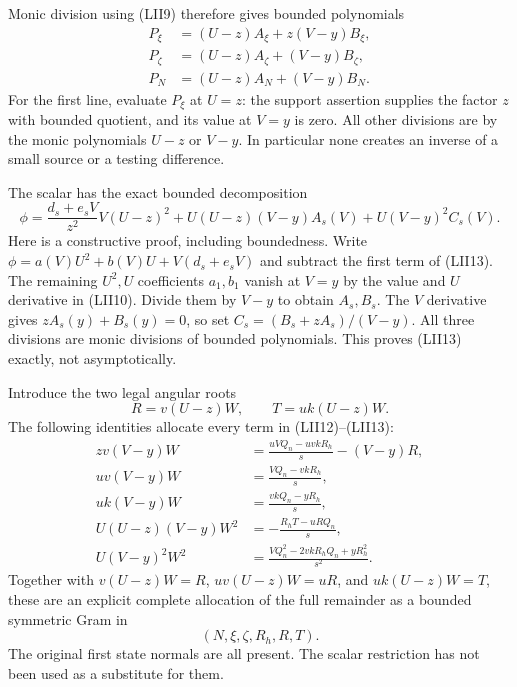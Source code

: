 Monic division using (LII9) therefore gives bounded polynomials
\[
\begin{split}
 P_\xi&=(U-z)A_\xi+z(V-y)B_\xi,\\
 P_\zeta&=(U-z)A_\zeta+(V-y)B_\zeta,\\
 P_N&=(U-z)A_N+(V-y)B_N.                         \end{split}\tag{LII12}
\]
For the first line, evaluate $P_\xi$ at $U=z$: the support assertion
supplies the factor $z$ with bounded quotient, and its value at $V=y$
is zero.  All other divisions are by the monic polynomials $U-z$
or $V-y$.  In particular none creates an inverse of a small source
or a testing difference.

The scalar has the exact bounded decomposition
\[
 \phi=\frac{d_s+e_sV}{z^2}V(U-z)^2
       +U(U-z)(V-y)A_s(V)+U(V-y)^2C_s(V).        \tag{LII13}
\]
Here is a constructive proof, including boundedness.  Write
$\phi=a(V)U^2+b(V)U+V(d_s+e_sV)$ and subtract the first term of
(LII13).  The remaining $U^2,U$ coefficients $a_1,b_1$ vanish at
$V=y$ by the value and $U$ derivative in (LII10).  Divide them by
$V-y$ to obtain $A_s,B_s$.  The $V$ derivative gives
$zA_s(y)+B_s(y)=0$, so set $C_s=(B_s+zA_s)/(V-y)$.
All three divisions are monic divisions of bounded polynomials.
This proves (LII13) exactly, not asymptotically.

Introduce the two legal angular roots
\[
 R=v(U-z)W,\qquad T=uk(U-z)W.                    \tag{LII14}
\]
The following identities allocate every term in (LII12)--(LII13):
\[
\begin{split}
 zv(V-y)W&=\frac{uVQ_n-uvkR_h}{s}-(V-y)R,\\
 uv(V-y)W&=\frac{VQ_n-vkR_h}{s},\\
 uk(V-y)W&=\frac{vkQ_n-yR_h}{s},\\
 U(U-z)(V-y)W^2&=-\frac{R_hT-uRQ_n}{s},\\
 U(V-y)^2W^2&=\frac{VQ_n^2-2vkR_hQ_n+yR_h^2}{s^2}.
                                                        \end{split}\tag{LII15}
\]
Together with $v(U-z)W=R$, $uv(U-z)W=uR$, and
$uk(U-z)W=T$, these are an explicit complete allocation of the
full remainder as a bounded symmetric Gram in
\[
                    (N,\xi,\zeta,R_h,R,T).       \tag{LII16}
\]
The original first state normals are all present.  The scalar
restriction has not been used as a substitute for them.

